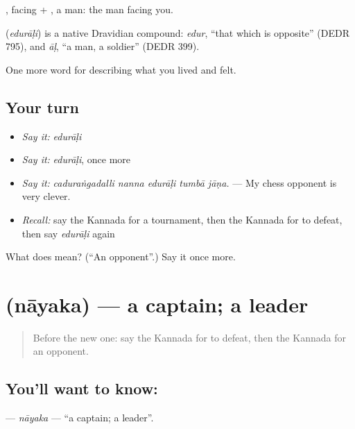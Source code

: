 , facing + , a man: the man facing you.

\begin{cousinweb}
\textbf{} (\emph{edurāḷi}) is a native Dravidian compound: \emph{edur}, \textquotedblleft{}that which is opposite\textquotedblright{} (DEDR 795), and \emph{āḷ}, \textquotedblleft{}a man, a soldier\textquotedblright{} (DEDR 399).
\end{cousinweb}

\begin{grammarlens}[title={What you've built}]
One more word for describing what you lived and felt.
\end{grammarlens}

\subsection*{Your turn}
\begin{itemize}
\raggedright
  \item \emph{Say it:} \emph{edurāḷi}
  \item \emph{Say it:} \emph{edurāḷi}, once more
  \item \emph{Say it:} \emph{caduraṅgadalli nanna edurāḷi tumbā jāṇa.} — My chess opponent is very clever.
  \item \emph{Recall:} say the Kannada for a tournament, then the Kannada for to defeat, then say \emph{edurāḷi} again
\end{itemize}

\begin{tcolorbox}[breakable,colback=teal!4,colframe=teal!35!black,title={Before you move on}]
What does  mean? (\textquotedblleft{}An opponent\textquotedblright{}.) Say it once more.
\end{tcolorbox}
\section[\texorpdfstring{\kn{ನಾಯಕ} (nāyaka)}{ನಾಯಕ (nāyaka)}]{ (nāyaka) — a captain; a leader}

\label{lesson:KA-C539-nayaka}



\begin{quote}
Before the new one: say the Kannada for to defeat, then the Kannada for an opponent.
\end{quote}

\subsection*{You'll want to know: }
\textbf{} — \emph{nāyaka} — \textquotedblleft{}a captain; a leader\textquotedblright{}.

